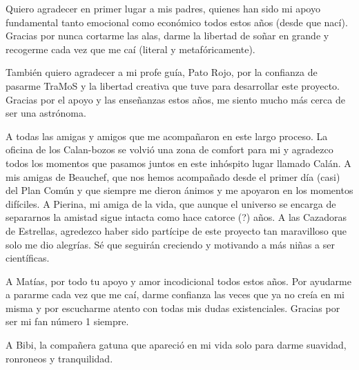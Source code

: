 \begin{thanks} %

Quiero agradecer en primer lugar a mis padres, quienes han sido mi apoyo fundamental tanto emocional como económico todos estos años (desde que nací). Gracias por nunca cortarme las alas, darme la libertad de soñar en grande y recogerme cada vez que me caí (literal y metafóricamente).

También quiero agradecer a mi profe guía, Pato Rojo, por la confianza de pasarme TraMoS y la libertad creativa que tuve para desarrollar este proyecto. Gracias por el apoyo y las enseñanzas estos años, me siento mucho más cerca de ser una astrónoma.

A todas las amigas y amigos que me acompañaron en este largo proceso. La oficina de los Calan-bozos se volvió una zona de comfort para mi y agradezco todos los momentos que pasamos juntos en este inhóspito lugar llamado Calán. A mis amigas de Beauchef, que nos hemos acompañado desde el primer día (casi) del Plan Común y que siempre me dieron ánimos y me apoyaron en los momentos difíciles. A Pierina, mi amiga de la vida, que aunque el universo se encarga de separarnos la amistad sigue intacta como hace catorce (?) años. A las Cazadoras de Estrellas, agredezco haber sido partícipe de este proyecto tan maravilloso que solo me dio alegrías. Sé que seguirán creciendo y motivando a más niñas a ser científicas.

A Matías, por todo tu apoyo y amor incodicional todos estos años. Por ayudarme a pararme cada vez que me caí, darme confianza las veces que ya no creía en mi misma y por escucharme atento con todas mis dudas existenciales. Gracias por ser mi fan número 1 siempre.

A Bibi, la compañera gatuna que apareció en mi vida solo para darme suavidad, ronroneos y tranquilidad. 

\end{thanks}
